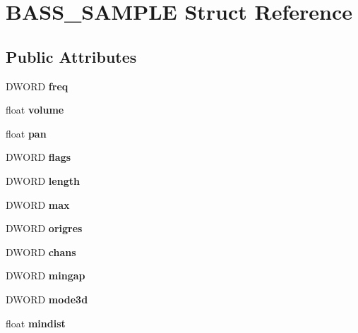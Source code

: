 \section{B\+A\+S\+S\+\_\+\+S\+A\+M\+P\+L\+E Struct Reference}
\label{struct_b_a_s_s___s_a_m_p_l_e}
\subsection*{Public Attributes}
\begin{DoxyCompactItemize}
\item 
D\+W\+O\+R\+D {\bfseries freq}\label{struct_b_a_s_s___s_a_m_p_l_e_acabd72a2635853202082a5ad0c9529e7}

\item 
float {\bfseries volume}\label{struct_b_a_s_s___s_a_m_p_l_e_a44fc378a594c2eabb25fb54b0809d632}

\item 
float {\bfseries pan}\label{struct_b_a_s_s___s_a_m_p_l_e_aae9f6113048ac8c46c1b4b8de3d3e032}

\item 
D\+W\+O\+R\+D {\bfseries flags}\label{struct_b_a_s_s___s_a_m_p_l_e_ae2863c9c7e8f3e40805cfb81759e9e51}

\item 
D\+W\+O\+R\+D {\bfseries length}\label{struct_b_a_s_s___s_a_m_p_l_e_afee703fb2be34e5ea6cd2d9a9e8ddff0}

\item 
D\+W\+O\+R\+D {\bfseries max}\label{struct_b_a_s_s___s_a_m_p_l_e_a42ecc61ca6008579bc2fcb4fb1bc19fe}

\item 
D\+W\+O\+R\+D {\bfseries origres}\label{struct_b_a_s_s___s_a_m_p_l_e_a9f0c4c3caeab28316ead100cc6d36844}

\item 
D\+W\+O\+R\+D {\bfseries chans}\label{struct_b_a_s_s___s_a_m_p_l_e_a0f7dc81cf0753dbe14848d61544e7f51}

\item 
D\+W\+O\+R\+D {\bfseries mingap}\label{struct_b_a_s_s___s_a_m_p_l_e_a17646b031533f3ecb07ee5318b484f44}

\item 
D\+W\+O\+R\+D {\bfseries mode3d}\label{struct_b_a_s_s___s_a_m_p_l_e_a20fcedf825bd2d62cff1a39dd4a79d4f}

\item 
float {\bfseries mindist}\label{struct_b_a_s_s___s_a_m_p_l_e_aae9039af2e1e14189bc6df67c89077de}


\end{DoxyCompactItemize}

